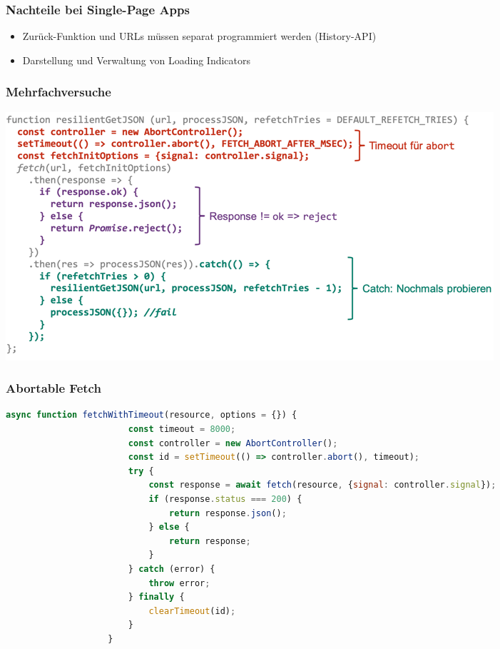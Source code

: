\documentclass[a4paper, landscape, 8pt]{scrartcl}
\begin{document}
\begin{multicols*}{4}
        \subsubsection{Nachteile {\tiny bei Single-Page Apps}}
        \begin{itemize}
            \item Zurück-Funktion und URLs müssen separat programmiert werden (History-API)
            \item Darstellung und Verwaltung von Loading Indicators
        \end{itemize}

        \subsubsection{Mehrfachversuche}
        \includegraphics[width=\columnwidth]{graphic/40-mehrfachversuche}

        \subsubsection{Abortable Fetch}
        \begin{lstlisting}[language=JavaScript]
                    async function fetchWithTimeout(resource, options = {}) {
                        const timeout = 8000;
                        const controller = new AbortController();
                        const id = setTimeout(() => controller.abort(), timeout);
                        try {
                            const response = await fetch(resource, {signal: controller.signal});
                            if (response.status === 200) {
                                return response.json();
                            } else {
                                return response;
                            }
                        } catch (error) {
                            throw error;
                        } finally {
                            clearTimeout(id);
                        }
                    }
        \end{lstlisting}


\end{multicols*}
\end{document}
